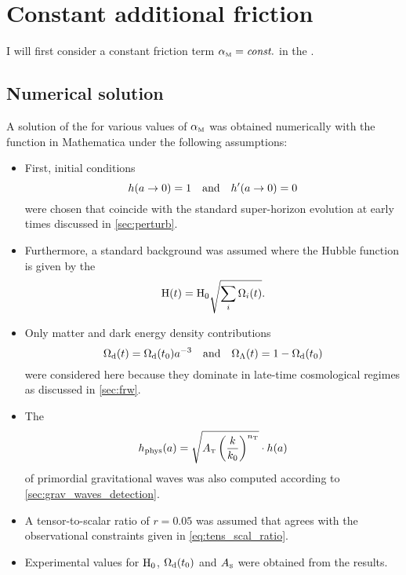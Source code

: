 \documentclass[12pt,parskip=half]{scrreprt}
\begin{document}
\section{Constant additional friction}\label{sec:param_friction_const}

I will first consider a constant friction term \({\alpha_{\textnormal{\tiny{M}}}}=\textnormal{\textit{const.}}\) in the . 


\subsection{Numerical solution}

A solution of the  for various values of \({\alpha_{\textnormal{\tiny{M}}}}\) was obtained numerically with the  function in Mathematica under the following assumptions:

\begin{itemize}

\item First, initial conditions
\begin{equation}
	h(a \to 0) = 1 \quad \text{and} \quad h^\prime(a \to 0) = 0
\end{equation}
were chosen that coincide with the standard super-horizon evolution at early times discussed in \autoref{sec:perturb}.

\item Furthermore, a standard \FLRW background was assumed where the Hubble function is given by the 
\begin{equation}
	\mathrm{H}(t) = \mathrm{H}_0 \sqrt{\sum_i\Omega_i(t)}
	\mathpunct{.}
\end{equation}

\item Only matter and dark energy density contributions
\begin{equation}
	\Omega_{\mathrm{d}}(t) = \Omega_{\mathrm{d}}(t_0) a^{-3} \quad \text{and} \quad \Omega_\Lambda(t) = 1 - \Omega_{\mathrm{d}}(t_0)
\end{equation}
were considered here because they dominate in late-time cosmological regimes as discussed in \autoref{sec:frw}.

\item The 
\begin{equation}
	h_\textnormal{phys}(a) = \sqrt{A_\tenspert\del{\frac{k}{k_0}}^{n_\tenspert}} \cdot h(a)
\end{equation}
of primordial gravitational waves was also computed according to \autoref{sec:grav_waves_detection}.

\item A tensor-to-scalar ratio of \(r=0.05\) was assumed that agrees with the observational constraints given in \eqref{eq:tens_scal_ratio}.

\item Experimental values for \(\mathrm{H}_0\), \(\Omega_{\mathrm{d}}(t_0)\) and \(A_{\textnormal{\tiny{S}}}\) were obtained from the \textcite{Planck2015Data} results.

\end{itemize}
\end{document}
